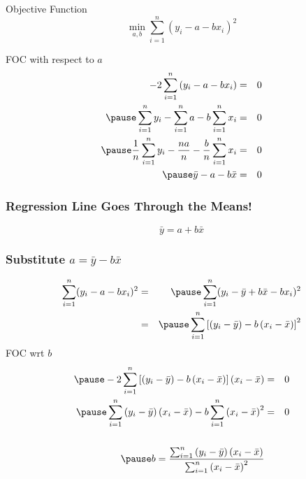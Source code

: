 \documentclass{beamer}
\begin{document}
\begin{frame}
\begin{block}{Objective Function}
$$\displaystyle \min_{a,b}  \sum_{i=1}^n (y_i - a - b x_i)^2$$
\end{block}
\begin{block}{FOC with respect to $a$}\pause
\begin{eqnarray*}
	-2 \sum_{i=1}^n\left(y_i - a -bx_i\right) &=& 0 \\\pause
	\sum_{i=1}^n y_i - \sum_{i=1}^n a - b\sum_{i=1}^n x_i &=& 0 \\\pause
	\frac{1}{n} \sum_{i=1}^n y_i - \frac{na}{n} -  \frac{b}{n} \sum_{i=1}^n x_i &=& 0\\\pause
	\bar{y} - a - b\bar{x} &=& 0
\end{eqnarray*}
\end{block}
\end{frame}
\begin{frame}

\frametitle{Regression Line Goes Through the Means!}
 \Huge
\begin{equation*}\boxed{\bar{y} = a + b\bar{x}}\end{equation*}
\normalsize
\end{frame}
\begin{frame}
  \frametitle{Substitute $a = \bar{y} - b \bar{x}$}
  \small
\begin{eqnarray*}
	\sum_{i=1}^n (y_i - a - b x_i)^2 &=& \pause\sum_{i=1}^n (y_i - \bar{y} + b\bar{x} - b x_i)^2\\
	&=&\pause\sum_{i=1}^n \left[ \left(y_i - \bar{y}\right) - b\left(x_i - \bar{x}\right) \right]^2
\end{eqnarray*}
\alert{FOC wrt $b$}
\begin{eqnarray*}\pause
	-2\sum_{i=1}^n \left[\left(y_i - \bar{y}\right) - b\left(x_i - \bar{x}\right) \right]\left(x_i - \bar{x} \right) &=& 0\\\pause
	\sum_{i=1}^n \left(y_i - \bar{y}\right)\left(x_i - \bar{x} \right) - b\sum_{i=1}^n \left(x_i - \bar{x}\right)^2 &=& 0\\ \\\pause
	b = \frac{\sum_{i=1}^n \left(y_i - \bar{y}\right)\left(x_i - \bar{x} \right)}{\sum_{i=1}^n \left(x_i - \bar{x}\right)^2}
\end{eqnarray*}
\end{frame}
\end{document}
